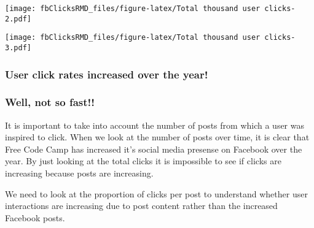 \documentclass[
]{article}
\newenvironment{Shaded}{\begin{snugshade}}{\end{snugshade}}
\newcommand{\DataTypeTok}[1]{\textcolor[rgb]{0.13,0.29,0.53}{#1}}
\newcommand{\DecValTok}[1]{\textcolor[rgb]{0.00,0.00,0.81}{#1}}
\newcommand{\KeywordTok}[1]{\textcolor[rgb]{0.13,0.29,0.53}{\textbf{#1}}}
\newcommand{\NormalTok}[1]{#1}
\newcommand{\OperatorTok}[1]{\textcolor[rgb]{0.81,0.36,0.00}{\textbf{#1}}}
\newcommand{\StringTok}[1]{\textcolor[rgb]{0.31,0.60,0.02}{#1}}
\begin{document}
\texttt{[image: fbClicksRMD\_files/figure-latex/Total thousand user clicks-2.pdf]}

\begin{Shaded}
\end{Shaded}

\texttt{[image: fbClicksRMD\_files/figure-latex/Total thousand user clicks-3.pdf]}

\hypertarget{user-click-rates-increased-over-the-year}{%
\subsubsection{User click rates increased over the
year!}\label{user-click-rates-increased-over-the-year}}

\hypertarget{well-not-so-fast}{%
\subsubsection{Well, not so fast!!}\label{well-not-so-fast}}

It is important to take into account the number of posts from which a
user was inspired to click. When we look at the number of posts over
time, it is clear that Free Code Camp has increased it's social media
presense on Facebook over the year. By just looking at the total clicks
it is impossible to see if clicks are increasing because posts are
increasing.

We need to look at the proportion of clicks per post to understand
whether user interactions are increasing due to post content rather than
the increased Facebook posts.
\end{document}
